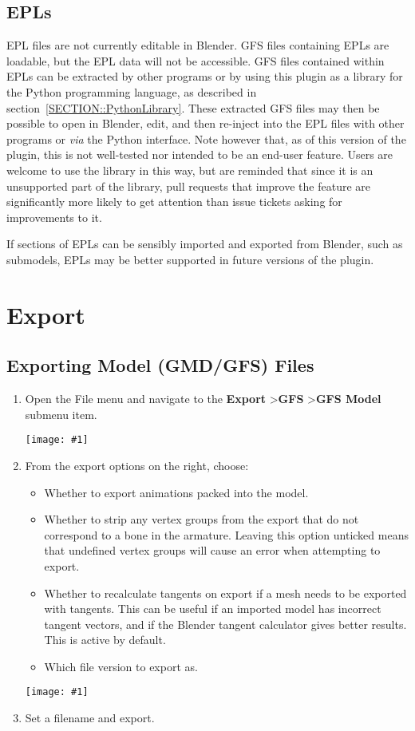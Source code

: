 \documentclass{article}
\newenvironment{guide}[1]
{
	\begin{center}
		\begin{tcolorbox}[%
			colback=black!20, 
			boxrule=0pt, 
			title=Step-by-step: #1,
			enhanced,
			breakable,
			overlay unbroken={%
                \draw[line width=1pt, black, rounded corners]
        	    (frame.north west) rectangle (frame.south east);
			},
    		overlay first={%
        		 \draw[line width=1pt, black, rounded corners]
        	    (frame.south west) -- (frame.north west) -- (frame.north east) -- (frame.south east);
                \draw[line width=1pt, black]
                (frame.south west) -- (frame.south east);
            },
    		overlay middle={%
                \draw[line width=1pt, black]
        	    (frame.north west) rectangle (frame.south east);
        	},
    		overlay last={%
                \draw[line width=1pt, black, rounded corners]
        	    (frame.north west) -- (frame.south west) -- (frame.south east) -- (frame.north east);
                \draw[line width=1pt, black]
                (frame.north west) -- (frame.north east);
           	}
        ]{}
    	\begin{enumerate}
}
{
    		\end{enumerate}
    	\end{tcolorbox}
	\end{center}  	 
}
\newcommand{\guideimage}[1]
{
	\begin{center}
		\texttt{[image: \#1]}
	\end{center}
}
\begin{document}
\clearpage

\subsection{EPLs}
\label{SECTION::Edits::Epls}
EPL files are not currently editable in Blender. GFS files containing EPLs are loadable, but the EPL data will not be accessible. GFS files contained within EPLs can be extracted by other programs or by using this plugin as a library for the Python programming language, as described in section~\ref{SECTION::PythonLibrary}. These extracted GFS files may then be possible to open in Blender, edit, and then re-inject into the EPL files with other programs or \textit{via} the Python interface. Note however that, as of this version of the plugin, this is not well-tested nor intended to be an end-user feature. Users are welcome to use the library in this way, but are reminded that since it is an unsupported part of the library, pull requests that improve the feature are significantly more likely to get attention than issue tickets asking for improvements to it.

If sections of EPLs can be sensibly imported and exported from Blender, such as submodels, EPLs may be better supported in future versions of the plugin.

\clearpage

\section{Export}
\subsection{Exporting Model (GMD/GFS) Files}
\label{SECTION::EXPORT::ExportingModels}
\begin{guide}{Accessing the Model Export Menu}
\item Open the File menu and navigate to the \textbf{Export} \textgreater\space \textbf{GFS} \textgreater\space \textbf{GFS Model} submenu item.
\guideimage{images/export/export_gmd.png}
\item From the export options on the right, choose:
\begin{itemize}
\item Whether to export animations packed into the model.
\item Whether to strip any vertex groups from the export that do not correspond to a bone in the armature. Leaving this option unticked means that undefined vertex groups will cause an error when attempting to export.
\item Whether to recalculate tangents on export if a mesh needs to be exported with tangents. This can be useful if an imported model has incorrect tangent vectors, and if the Blender tangent calculator gives better results. This is active by default.
\item Which file version to export as.
\end{itemize}
\guideimage{images/export/export_gmd_properties.png}
\item Set a filename and export.
\end{guide}
\end{document}

